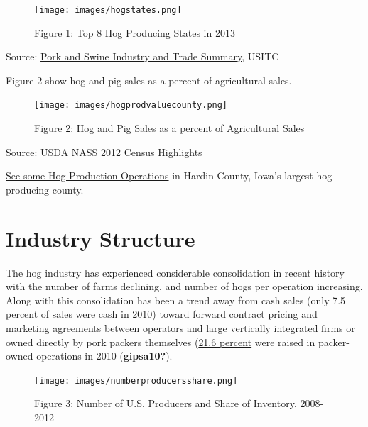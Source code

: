 \documentclass[
  letterpaper,
  DIV=11,
  numbers=noendperiod]{scrreprt}
\begin{document}
\begin{figure}

{\centering \texttt{[image: images/hogstates.png]}

}

\caption{Figure 1: Top 8 Hog Producing States in 2013}

\end{figure}

Source: \href{pdf-Readings/pork_and_swine_summary.pdf}{Pork and Swine
Industry and Trade Summary}, USITC

Figure 2 show hog and pig sales as a percent of agricultural sales.

\begin{figure}

{\centering \texttt{[image: images/hogprodvaluecounty.png]}

}

\caption{Figure 2: Hog and Pig Sales as a percent of Agricultural Sales}

\end{figure}

Source: \href{pdf-Readings/12CensusHighlightsHogs.pdf}{USDA NASS 2012
Census Highlights}

\href{https://www.google.com/maps/place/Hardin+County,+IA/@42.3833668,-93.3907209,60627m/data=!3m2!1e3!4b1!4m2!3m1!1s0x87ee2ed39f2db5df:0x67a785cf003d5369!6m1!1e1}{See
some Hog Production Operations} in Hardin County, Iowa's largest hog
producing county.

\hypertarget{industry-structure}{%
\section{Industry Structure}\label{industry-structure}}

The hog industry has experienced considerable consolidation in recent
history with the number of farms declining, and number of hogs per
operation increasing. Along with this consolidation has been a trend
away from cash sales (only 7.5 percent of sales were cash in 2010)
toward forward contract pricing and marketing agreements between
operators and large vertically integrated firms or owned directly by
pork packers themselves (\href{pdf-readings/gipsa10.pdf}{21.6 percent}
were raised in packer-owned operations in 2010 (\textbf{gipsa10?}).

\begin{figure}

{\centering \texttt{[image: images/numberproducersshare.png]}

}

\caption{Figure 3: Number of U.S. Producers and Share of Inventory,
2008-2012}

\end{figure}
\end{document}
